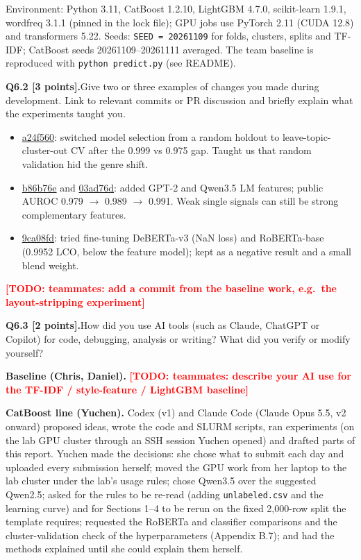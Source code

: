 \documentclass[11pt,letterpaper]{article}
\newcommand{\todo}[1]{\textcolor{red}{\textbf{[TODO: #1]}}}
\newcommand{\question}[2]{\needspace{4\baselineskip}\par\addvspace{0.45em}\noindent\textbf{#1}\quad #2\par\nobreak\vspace{0.1em}}
\begin{document}
Environment: Python 3.11, CatBoost 1.2.10, LightGBM 4.7.0, scikit-learn 1.9.1, wordfreq 3.1.1 (pinned in the lock file); GPU jobs use PyTorch 2.11 (CUDA 12.8) and transformers 5.22. Seeds: \texttt{SEED = 20261109} for folds, clusters, splits and TF-IDF; CatBoost seeds 20261109--20261111 averaged. The team baseline is reproduced with \texttt{python predict.py} (see README).
\question{Q6.2 [3 points].}{Give two or three examples of changes you made during development. Link to relevant commits or PR discussion and briefly explain what the experiments taught you.}
\begin{itemize}
\item \href{https://github.com/cviets/human-or-ai-submissions/commit/a24f560f3da88f978c8f9efe91a45eb73b23e4da}{a24f560}: switched model selection from a random holdout to leave-topic-cluster-out CV after the 0.999 vs 0.975 gap. Taught us that random validation hid the genre shift.
\item \href{https://github.com/cviets/human-or-ai-submissions/commit/b86b76ec66cc121461f510e625b9fb9184aa14e4}{b86b76e} and \href{https://github.com/cviets/human-or-ai-submissions/commit/03ad76d678b6b0316550346364f4f9e3af54a1af}{03ad76d}: added GPT-2 and Qwen3.5 LM features; public AUROC 0.979 $\to$ 0.989 $\to$ 0.991. Weak single signals can still be strong complementary features.
\item \href{https://github.com/cviets/human-or-ai-submissions/commit/9ca08fd6a8bfd41a2a41e2c67475d63748b46084}{9ca08fd}: tried fine-tuning DeBERTa-v3 (NaN loss) and RoBERTa-base (0.9952 LCO, below the feature model); kept as a negative result and a small blend weight.
\end{itemize}
\todo{teammates: add a commit from the baseline work, e.g.\ the layout-stripping experiment}
\question{Q6.3 [2 points].}{How did you use AI tools (such as Claude, ChatGPT or Copilot) for code, debugging, analysis or writing? What did you verify or modify yourself?}
\textbf{Baseline (Chris, Daniel).} \todo{teammates: describe your AI use for the TF-IDF / style-feature / LightGBM baseline}

\textbf{CatBoost line (Yuchen).} Codex (v1) and Claude Code (Claude Opus 5.5, v2 onward) proposed ideas, wrote the code and SLURM scripts, ran experiments (on the lab GPU cluster through an SSH session Yuchen opened) and drafted parts of this report. Yuchen made the decisions: she chose what to submit each day and uploaded every submission herself; moved the GPU work from her laptop to the lab cluster under the lab's usage rules; chose Qwen3.5 over the suggested Qwen2.5; asked for the rules to be re-read (adding \texttt{unlabeled.csv} and the learning curve) and for Sections 1--4 to be rerun on the fixed 2,000-row split the template requires; requested the RoBERTa and classifier comparisons and the cluster-validation check of the hyperparameters (Appendix B.7); and had the methods explained until she could explain them herself.
\end{document}
